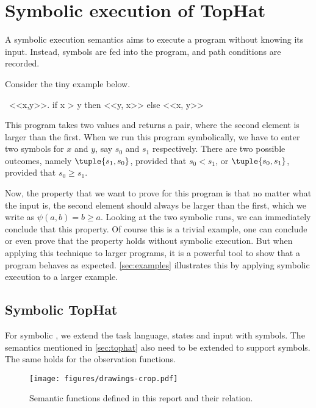 
\section{Symbolic execution of TopHat}
\label{sec:symbolic}

A symbolic execution semantics aims to execute a program without knowing its input.
Instead, symbols are fed into the program, and path conditions are recorded.

Consider the tiny example below.
\begin{TASK}
  \ <<x,y>>. if x > y then <<y, x>> else <<x, y>>
\end{TASK}

This program takes two values and returns a pair, where the second element is larger than the first.
When we run this program symbolically, we have to enter two symbols for $x$ and $y$, say $s_0$ and $s_1$ respectively.
There are two possible outcomes, namely
$\tuple{s_1,s_0}$, provided that $s_0 < s_1$, or
$\tuple{s_0,s_1}$, provided that $s_0 \geq s_1$.

Now, the property that we want to prove for this program is that no matter what the input is, the second element should always be larger than the first, which we write as $\psi(a,b)= b \geq a$.
Looking at the two symbolic runs, we can immediately conclude that this property.
Of course this is a trivial example, one can conclude or even prove that the property holds without symbolic execution.
But when applying this technique to larger programs, it is a powerful tool to show that a program behaves as expected.
\cref{sec:examples} illustrates this by applying symbolic execution to a larger example.


\subsection{Symbolic TopHat}

For symbolic \TOPHAT, we extend the task language, states and input with symbols.
The semantics mentioned in \cref{sec:tophat} also need to be extended to support symbols.
The same holds for the observation functions.


\begin{figure}[h]
  \centering
  \texttt{[image: figures/drawings-crop.pdf]}
  \caption{
    Semantic functions defined in this report and their relation.
  }
  \label{fig:semantic-functions}
\end{figure}

